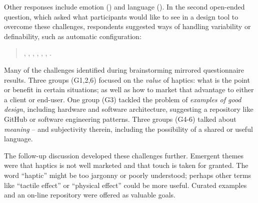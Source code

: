 \noindent
Other responses include emotion () and language ().
In the second open-ended question, which asked what participants would like to see in a design tool to overcome these challenges,
respondents suggested ways of handling variability or  definability, such as automatic configuration: %

\begin{quote}
    ,
    ,
    ,
    ,
    ,
    ,
    .
\end{quote}


Many of the challenges identified during brainstorming mirrored questionnaire results.
Three groups (G1,2,6) focused on the \textit{value} of haptics: what is the point or benefit %
in certain situations; as well as how to market that advantage to either a client or end-user.  %
One group (G3) tackled the problem of \textit{examples of good design}, including hardware and software architecture, suggesting a repository like GitHub or software engineering patterns.
Three groups (G4-6) talked about \textit{meaning} -- and subjectivity therein, including the possibility of a shared or useful language.

The follow-up discussion developed these challenges further. 
Emergent themes were that
haptics is not well marketed and that touch is taken for granted. The word ``haptic'' might be too jargonny or poorly understood; perhaps other terms like ``tactile effect'' or ``physical effect'' could be more useful.
Curated examples and an on-line repository were offered as valuable goals.





